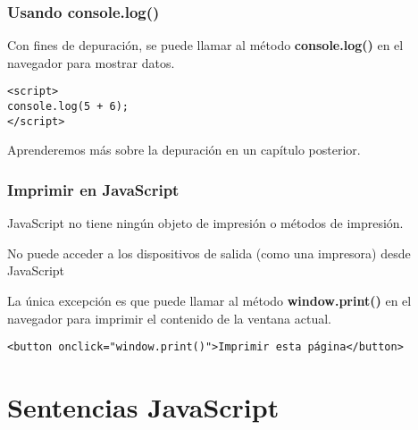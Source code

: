 \begin{frame}[fragile]
  \frametitle{Usando console.log()}

  Con fines de depuración, se puede llamar al método \textbf{console.log()}
  en el navegador para mostrar datos.

  \vspace{\baselineskip}
  \begin{lstlisting}
<script>
console.log(5 + 6);
</script>
  \end{lstlisting}

  \begin{exampleblock}{}
  Aprenderemos más sobre la depuración en un capítulo posterior.
  \end{exampleblock}
\end{frame}

\begin{frame}[fragile]
  \frametitle{Imprimir en JavaScript}

  JavaScript no tiene ningún objeto de impresión o métodos de impresión.

  \vspace{\baselineskip}
  No puede acceder a los dispositivos de salida (como una impresora)
  desde JavaScript

  \vspace{\baselineskip}
  La única excepción es que puede llamar al método
  \textbf{window.print()} en el navegador para imprimir el
  contenido de la ventana actual. 

  \vspace{\baselineskip}
  \begin{lstlisting}
<button onclick="window.print()">Imprimir esta página</button>
  \end{lstlisting}
\end{frame}

\section{Sentencias JavaScript}

